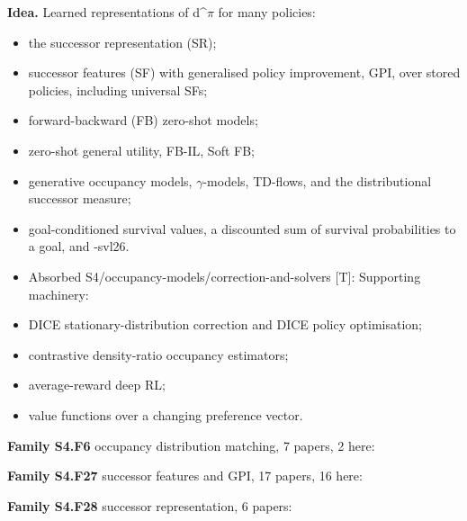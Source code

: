 \documentclass[10pt]{article}
\newcommand{\memb}[1]{\par\smallskip\textbf{#1}\quad}
\begin{document}
\textbf{Idea.} Learned representations of d\^{}\ensuremath{\pi} for many policies:
\begin{itemize}[nosep,leftmargin=1.2em]
\item the successor representation (SR);
\item successor features (SF) with generalised policy improvement, GPI, over stored policies, including universal SFs;
\item forward-backward (FB) zero-shot models;
\item zero-shot general utility, FB-IL, Soft FB;
\item generative occupancy models, \ensuremath{\gamma}-models, TD-flows, and the distributional successor measure;
\item goal-conditioned survival values, a discounted sum of survival probabilities to a goal, \citet{NguimatsiaTiofack-survival26} and -svl26.
\item Absorbed S4/occupancy-models/correction-and-solvers [T]: Supporting machinery:
\item DICE stationary-distribution correction and DICE policy optimisation;
\item contrastive density-ratio occupancy estimators;
\item average-reward deep RL;
\item value functions over a changing preference vector.
\end{itemize}


\memb{Family S4.F6} occupancy distribution matching, 7 papers, 2 here: {\footnotesize \citetext{\citealp{Kostrikov-imitation20}; \citealp{Ma-versatile22}}}

\memb{Family S4.F27} successor features and GPI, 17 papers, 16 here: {\footnotesize \citetext{\citealp{Barreto-successor17}; \citealp{Borsa-universal19}; \citealp{Alegre-optimistic22}; \citealp{Jain-nonadversarial24}; \citealp{Zhu-distributional24}; \citealp{Kulkarni-deep16}; \citealp{Hunt-composing19}; \citealp{Barreto-transfer18}; \citealp{Barreto-fast20}; \citealp{Brantley-successor21}; \citealp{Reinke-xi21}; \citealp{Zahavy-discovering21}; \citealp{Carvalho-combining23}; \citealp{Chen-selfsupervised23}; \citealp{Grillotti-qualitydiversity24}; \citealp{Chua-which25}}}

\memb{Family S4.F28} successor representation, 6 papers: {\footnotesize \citetext{\citealp{Dayan-improving93}; \citealp{Momennejad-successor17}; \citealp{Stachenfeld-hippocampus17}; \citealp{Gershman-successor18}; \citealp{Machado-temporal23}; \citealp{Piray-linear21}}}
\end{document}
